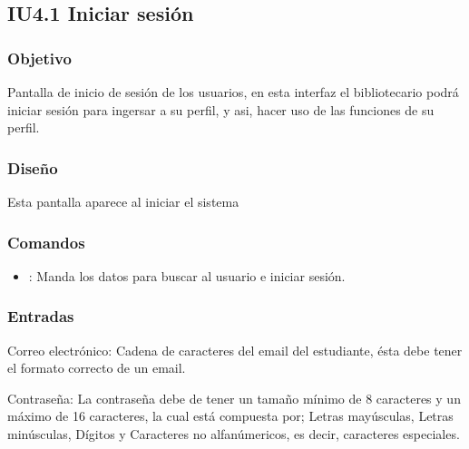 \newpage
\subsection{IU4.1 Iniciar sesión}

\subsubsection{Objetivo}
	Pantalla de inicio de sesión de los usuarios, en esta interfaz el bibliotecario podrá iniciar sesión para ingersar a su perfil, y asi, hacer uso de las funciones de su perfil.

\subsubsection{Diseño}
	Esta pantalla aparece al iniciar el sistema


\subsubsection{Comandos}
	\begin{itemize}
		\item {}: Manda los datos para buscar al usuario e iniciar sesión.
	\end{itemize}

\subsubsection{Entradas}
	\begin{Citemize}
		\item Correo electrónico: Cadena de caracteres del email del estudiante, ésta debe tener el formato correcto de un email. 
		\item Contraseña: La contraseña debe de tener un tamaño mínimo de 8 caracteres y un máximo de 16 caracteres, la cual está compuesta por; Letras mayúsculas, Letras minúsculas, Dígitos y Caracteres no alfanúmericos, es decir, caracteres especiales.
	\end{Citemize}	